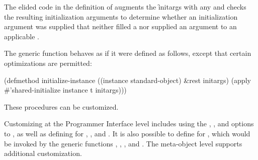 The elided code in the definition of  
augments the \f{initargs} with any  and
checks the
resulting
initialization arguments to determine whether an initialization
argument was supplied that neither filled a  nor supplied an argument
to an applicable . 
                      
The generic function  behaves as if it were
defined as follows, except that certain optimizations are permitted:

\code
 (defmethod initialize-instance ((instance standard-object) &rest initargs)
   (apply #'shared-initialize instance t initargs)))
\endcode

These procedures can be customized.
                                                                  
Customizing at the Programmer Interface level includes using the 
, , and  options to
, as well as defining 
for , 
,
and .  It is also possible to define
 for , which would be invoked by the
generic functions , 
, 
, and 
.  
The meta-object level supports additional
customization.
                                                                
